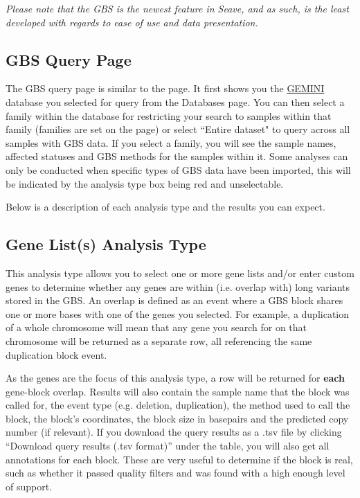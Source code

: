 \documentclass[11pt, a4paper]{article}
\newcommand{\GEMINI}{\href{https://gemini.readthedocs.io}{GEMINI} } %
\begin{document}
\textit{Please note that the GBS is the newest feature in Seave, and as such, is the least developed with regards to ease of use and data presentation.}

\subsection{GBS Query Page}

The GBS query page is similar to the  page. It first shows you the \GEMINI database you selected for query from the Databases page. You can then select a family within the database for restricting your search to samples within that family (families are set on the  page) or select ``Entire dataset" to query across all samples with GBS data. If you select a family, you will see the sample names, affected statuses and GBS methods for the samples within it. Some analyses can only be conducted when specific types of GBS data have been imported, this will be indicated by the analysis type box being red and unselectable.

Below is a description of each analysis type and the results you can expect.

\subsection{Gene List(s) Analysis Type}

This analysis type allows you to select one or more gene lists and/or enter custom genes to determine whether any genes are within (i.e. overlap with) long variants stored in the GBS. An overlap is defined as an event where a GBS block shares one or more bases with one of the genes you selected. For example, a duplication of a whole chromosome will mean that any gene you search for on that chromosome will be returned as a separate row, all referencing the same duplication block event.

As the genes are the focus of this analysis type, a row will be returned for \textbf{each} gene-block overlap. Results will also contain the sample name that the block was called for, the event type (e.g. deletion, duplication), the method used to call the block, the block's coordinates, the block size in basepairs and the predicted copy number (if relevant). If you download the query results as a .tsv file by clicking ``Download query results (.tsv format)'' under the table, you will also get all annotations for each block. These are very useful to determine if the block is real, such as whether it passed quality filters and was found with a high enough level of support. 
\end{document}
